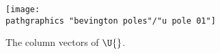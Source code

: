 \begin{figure}[t]
	\texttt{[image: \\pathgraphics "bevington poles"/"u pole 01"]}
	\caption[The column vectors of $\U{}$]{The column vectors of $\U{}$.}
	\label{fig:bevington poles}
\end{figure}

\endinput  %


